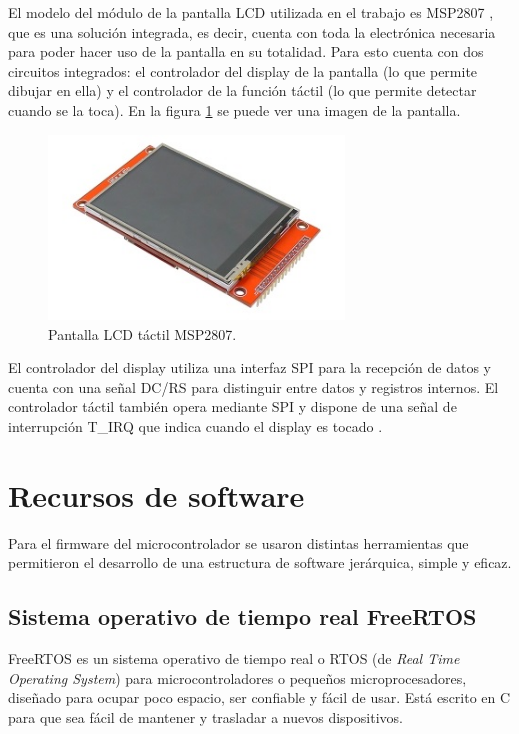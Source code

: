 El modelo del módulo de la pantalla LCD utilizada en el trabajo es MSP2807 \citep{MSP2807}, que es una solución integrada, es decir, cuenta con toda la electrónica necesaria para poder hacer uso de la pantalla en su totalidad. Para esto cuenta con dos circuitos integrados: el controlador del display de la pantalla (lo que permite dibujar en ella) y el controlador de la función táctil (lo que permite detectar cuando se la toca). En la figura \ref{fig:pantLCD} se puede ver una imagen de la pantalla.

\begin{figure}[H]
\centering
\includegraphics[width=0.7\textwidth]{./Figures/pant_LCD.png}
\caption{Pantalla LCD táctil MSP2807\protect\footnotemark.}
\label{fig:pantLCD}
\end{figure}


El controlador del display utiliza una interfaz SPI para la recepción de datos y cuenta con una señal DC/RS para distinguir entre datos y registros internos. El controlador táctil también opera mediante SPI y dispone de una señal de interrupción T\_IRQ que indica cuando el display es tocado \citep{MSP2807}.

\section{Recursos de software}

Para el firmware del microcontrolador se usaron distintas herramientas que permitieron el desarrollo de una estructura de software jerárquica, simple y eficaz.

\subsection{Sistema operativo de tiempo real FreeRTOS}

FreeRTOS es un sistema operativo de tiempo real o RTOS (de \textit{Real Time Operating System}) para microcontroladores o pequeños microprocesadores, diseñado para ocupar poco espacio, ser confiable y fácil de usar. Está escrito en C para que sea fácil de mantener y trasladar a nuevos dispositivos.

